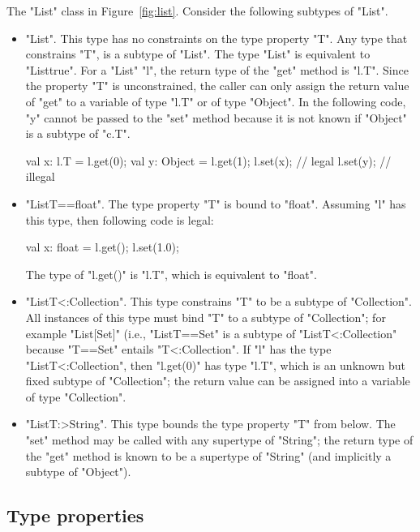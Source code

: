 \documentclass[preprint,nocopyrightspace,9pt]{sigplanconf}
\begin{document}
The \xcd"List" class in Figure~\ref{fig:list}.
Consider the following subtypes  of \xcd"List".
\begin{itemize}
\item \xcd"List".  This type has no constraints on the type
property \xcd"T".
Any type that constrains \xcd"T",
is a subtype of \xcd"List".  The type \xcd"List" is equivalent to
\xcd"List{true}".
%
For a \xcd"List" \xcd"l", the return type of the \xcd"get" method
is \xcd"l.T".
Since the property \xcd"T" is unconstrained,
the caller can only assign the return value of \xcd"get"
to a variable of type \xcd"l.T" or of type \xcd"Object".
In the following code, \xcd"y" cannot be passed to the \xcd"set" method
because it is not known if \xcd"Object" is a subtype of \xcd"c.T".
\begin{xten}
val x: l.T = l.get(0);
val y: Object = l.get(1);
l.set(x); // legal
l.set(y); // illegal
\end{xten}

\item \xcd"List{T==float}".
The type property \xcd"T" is bound to \xcd"float".
Assuming \xcd"l" has this type, then following code is legal:
\begin{xten}
val x: float = l.get();
l.set(1.0);
\end{xten}
The type of \xcd"l.get()" is \xcd"l.T", which is equivalent to
\xcd"float".

\item \xcd"List{T<:Collection}".
This type constrains \xcd"T" to be a subtype of \xcd"Collection".
All instances of this type must bind \xcd"T" to a subtype of
\xcd"Collection"; for example \xcd"List[Set]" (i.e.,
\xcd"List{T==Set}" is a subtype of
\xcd"List{T<:Collection}" because \xcd"T==Set" entails
\xcd"T<:Collection".
%
If \xcd"l" has the type \xcd"List{T<:Collection}",
then \xcd"l.get(0)" has type \xcd"l.T", which is an unknown but
fixed subtype of \xcd"Collection"; the return value can be
assigned into a variable of type \xcd"Collection".

\item \xcd"List{T:>String}".  This type bounds the type property
\xcd"T"
from below.  The \xcd"set" method may be called with any
supertype of \xcd"String"; the return type of the \xcd"get"
method is known to be a
supertype of \xcd"String" (and implicitly a subtype of \xcd"Object").
\end{itemize}

\subsection{Type properties}
\end{document}
